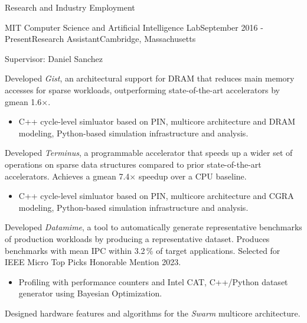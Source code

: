 \documentclass{resume} %
\begin{document}
\begin{rSection}{Research and Industry Employment}

\begin{rSubsection}{MIT Computer Science and Artificial Intelligence Lab}{September 2016 - Present}{Research Assistant}{Cambridge, Massachusetts}

\item Supervisor: Daniel Sanchez
\item Developed {\it Gist}, an architectural support for DRAM that reduces main memory accesses for sparse workloads,
    outperforming state-of-the-art accelerators by gmean 1.6$\times$.
    \vspace{-0.2cm}
    {\small
    \begin{itemize}
    \item C++ cycle-level simluator based on PIN, multicore architecture and DRAM modeling, Python-based simulation infrastructure and analysis.
    \end{itemize}
    }
    \vspace{0.2cm}
\item Developed {\it Terminus}, a programmable accelerator that speeds up a wider set of operations on sparse data structures
    compared to prior state-of-the-art accelerators. Achieves a gmean 7.4$\times$ speedup over a CPU baseline.
    \vspace{-0.2cm}
    {\small
    \begin{itemize}
    \item C++ cycle-level simluator based on PIN, multicore architecture and CGRA modeling, Python-based simulation infrastructure and analysis.
    \end{itemize}
    }
    \vspace{0.2cm}
\item Developed {\it Datamime}, a tool to automatically generate representative benchmarks of production workloads
    by producing a representative dataset. Produces benchmarks with mean IPC within 3.2\,\% of target applications.
    Selected for IEEE Micro Top Picks Honorable Mention 2023.
    \vspace{-0.2cm}
    {\small
    \begin{itemize}
        \item Profiling with performance counters and Intel CAT, C++/Python dataset generator using Bayesian Optimization.
    \end{itemize}
}
    \vspace{0.2cm}
\item Designed hardware features and algorithms for the {\it Swarm} multicore architecture.
\end{rSubsection}


\end{rSection}
\end{document}
